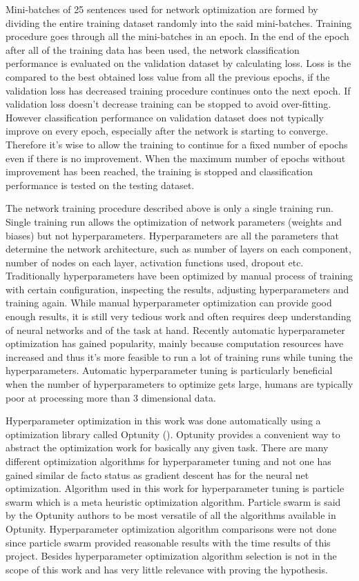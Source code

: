 \documentclass[12pt,a4paper,english
]{tutthesis}
\begin{document}
Mini-batches of 25 sentences used for network optimization are formed by dividing the entire training dataset randomly into the said mini-batches. Training procedure goes through all the mini-batches in an epoch. In the end of the epoch after all of the training data has been used, the network classification performance is evaluated on the validation dataset by calculating loss. Loss is the compared to the best obtained loss value from all the previous epochs, if the validation loss has decreased training procedure continues onto the next epoch. If validation loss doesn't decrease training can be stopped to avoid over-fitting. However classification performance on validation dataset does not typically improve on every epoch, especially after the network is starting to converge. Therefore it's wise to allow the training to continue for a fixed number of epochs even if there is no improvement. When the maximum number of epochs without improvement has been reached, the training is stopped and classification performance is tested on the testing dataset.

The network training procedure described above is only a single training run. Single training run allows the optimization of network parameters (weights and biases) but not hyperparameters. Hyperparameters are all the parameters that determine the network architecture, such as number of layers on each component, number of nodes on each layer, activation functions used, dropout etc. Traditionally hyperparameters have been optimized by manual process of training with certain configuration, inspecting the results, adjusting hyperparameters and training again. While manual hyperparameter optimization can provide good enough results, it is still very tedious work and often requires deep understanding of neural networks and of the task at hand. Recently automatic hyperparameter optimization has gained popularity, mainly because computation resources have increased and thus it's more feasible to run a lot of training runs while tuning the hyperparameters. Automatic hyperparameter tuning is particularly beneficial when the number of hyperparameters to optimize gets large, humans are typically poor at processing more than 3 dimensional data.

Hyperparameter optimization in this work was done automatically using a optimization library called Optunity (\cite{optunity}). Optunity provides a convenient way to abstract the optimization work for basically any given task. There are many different optimization algorithms for hyperparameter tuning and not one has gained similar de facto status as gradient descent has for the neural net optimization. Algorithm used in this work for hyperparameter tuning is particle swarm which is a meta heuristic optimization algorithm. Particle swarm is said by the Optunity authors to be most versatile of all the algorithms available in Optunity. Hyperparameter optimization algorithm comparisons were not done since particle swarm provided reasonable results with the time results of this project. Besides hyperparameter optimization algorithm selection is not in the scope of this work and has very little relevance with proving the hypothesis.
\end{document}
